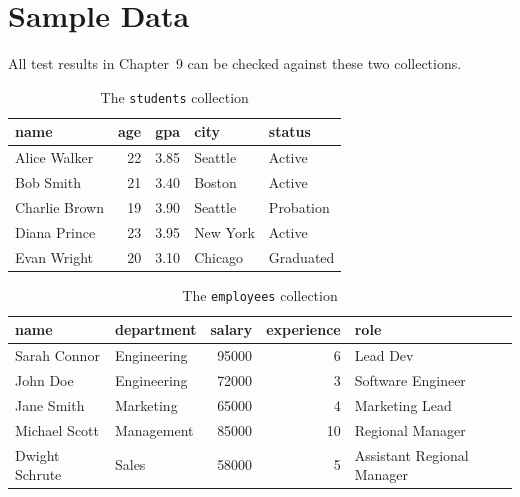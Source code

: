 \documentclass[12pt,a4paper]{report}
\newcommand{\codeus}{\textunderscore\allowbreak}
\DeclareRobustCommand{\code}[1]{\texttt{\let\_\codeus #1}}
\begin{document}
\section{Sample Data}\label{sec:data}
All test results in Chapter~9 can be checked against these two collections.
\begin{table}[H]
\centering\small
\begin{tabular}{|l|r|r|l|l|}
\hline
\textbf{name} & \textbf{age} & \textbf{gpa} & \textbf{city} & \textbf{status} \\ \hline
Alice Walker & 22 & 3.85 & Seattle & Active \\ \hline
Bob Smith & 21 & 3.40 & Boston & Active \\ \hline
Charlie Brown & 19 & 3.90 & Seattle & Probation \\ \hline
Diana Prince & 23 & 3.95 & New York & Active \\ \hline
Evan Wright & 20 & 3.10 & Chicago & Graduated \\ \hline
\end{tabular}
\caption{The \code{students} collection}
\end{table}
\begin{table}[H]
\centering\small
\begin{tabular}{|l|l|r|r|l|}
\hline
\textbf{name} & \textbf{department} & \textbf{salary} & \textbf{experience} & \textbf{role} \\ \hline
Sarah Connor & Engineering & 95000 & 6 & Lead Dev \\ \hline
John Doe & Engineering & 72000 & 3 & Software Engineer \\ \hline
Jane Smith & Marketing & 65000 & 4 & Marketing Lead \\ \hline
Michael Scott & Management & 85000 & 10 & Regional Manager \\ \hline
Dwight Schrute & Sales & 58000 & 5 & Assistant Regional Manager \\ \hline
\end{tabular}
\caption{The \code{employees} collection}
\end{table}
\end{document}
